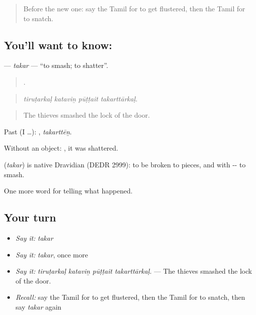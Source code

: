 \label{lesson:TA-C304-takar}



\begin{quote}
Before the new one: say the Tamil for to get flustered, then the Tamil for to snatch.
\end{quote}

\subsection*{You'll want to know: }
\textbf{} — \emph{takar} — \textquotedblleft{}to smash; to shatter\textquotedblright{}.

\begin{quote}
   .
\end{quote}

\begin{quote}
\emph{tiruṭarkaḷ kataviṉ pūṭṭait takarttārkaḷ.}
\end{quote}

\begin{quote}
The thieves smashed the lock of the door.
\end{quote}

Past (I …): , \emph{takarttēṉ}.

Without an object: , it was shattered.

\begin{cousinweb}
\textbf{} (\emph{takar}) is native Dravidian (DEDR 2999): to be broken to pieces, and with -- to smash.
\end{cousinweb}

\begin{grammarlens}[title={What you've built}]
One more word for telling what happened.
\end{grammarlens}

\subsection*{Your turn}
\begin{itemize}
\raggedright
  \item \emph{Say it:} \emph{takar}
  \item \emph{Say it:} \emph{takar}, once more
  \item \emph{Say it:} \emph{tiruṭarkaḷ kataviṉ pūṭṭait takarttārkaḷ.} — The thieves smashed the lock of the door.
  \item \emph{Recall:} say the Tamil for to get flustered, then the Tamil for to snatch, then say \emph{takar} again
\end{itemize}

